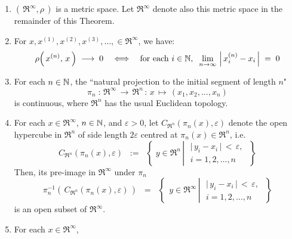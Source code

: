 \begin{theorem}
\label{MetricSpacePropertiesRInfinity}
\mbox{}
\begin{enumerate}
\item	$\left(\,\Re^{\infty},\rho\,\right)$ is a metric space.
		Let $\Re^{\infty}$ denote also this metric space in the remainder of this Theorem.
\item	For $x, x^{(1)}, x^{(2)}, x^{(3)}, \ldots, \in \Re^{\infty}$, we have:
		\begin{equation*}
		\rho\!\left(\,x^{(n)},\,x\,\right) \; \longrightarrow \; 0
		\quad\Longleftrightarrow\quad
		\textnormal{for each $i \in \mathbb{N}$},\;\;
		\lim_{n\rightarrow\infty}\,\left\vert\,x^{(n)}_{i} - x_{i}\,\right\vert \; = \; 0
		\end{equation*}
\item	For each $n \in \mathbb{N}$, the ``natural projection to the initial segment of length $n$"
		\begin{equation*}
		\pi_{n} \; : \, \Re^{\infty} \,\longrightarrow\, \Re^{n} \, : \, x \,\longmapsto\, (x_{1},x_{2},\ldots,x_{n})
		\end{equation*}
		is continuous, where $\Re^{n}$ has the usual Euclidean topology.
\item	For each $x \in \Re^{\infty}$, $n \in \mathbb{N}$, and $\varepsilon > 0$,
		let $C_{\Re^{n}}(\pi_{n}(x),\varepsilon)$ denote the open hypercube in $\Re^{n}$
		of side length $2\varepsilon$ centred at $\pi_{n}(x) \in \Re^{n}$, i.e.
		\begin{equation*}
		C_{\Re^{n}}(\pi_{n}(x),\varepsilon)
		\;\; := \;\;
		\left\{\;
		y \in \Re^{n}
		\,\left\vert\;
		\begin{array}{c} \vert\,y_{i} - x_{i}\,\vert\,<\,\varepsilon,\\ i = 1, 2, \ldots, n\end{array}
		\right.		
		\;\right\}
		\end{equation*}
		Then, its pre-image in $\Re^{\infty}$ under $\pi_{n}$
		\begin{equation*}
		\pi_{n}^{-1}\!\left(\,C_{\Re^{n}}(\pi_{n}(x),\varepsilon)\,\right)
		\;\; = \;\;
		\left\{\;\,
		y \in \Re^{\infty}
		\,\left\vert\;
		\begin{array}{c} \vert\,y_{i} - x_{i}\,\vert\,<\,\varepsilon,\\ i = 1, 2, \ldots, n\end{array}
		\right.
		\;\right\}
		\end{equation*}
		is an open subset of $\Re^{\infty}$.
\item	\label{OpenBallsContainPreimagesOfOpenHypercubes}For each $x \in \Re^{\infty}$,

\end{enumerate}
\end{theorem}
